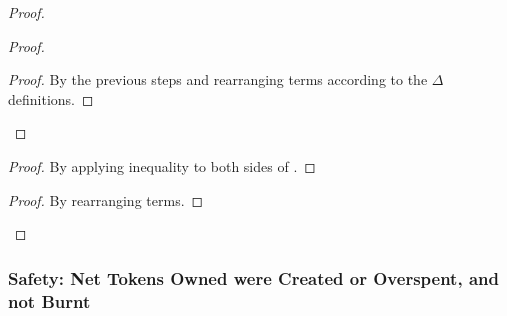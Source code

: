 \documentclass[9pt, oneside]{article}   	%
\begin{document}
\begin{proof}
\begin{proof}
		\qedstep
		\begin{proof}
			By the previous steps and rearranging terms according to the $\Delta$ definitions.
		\end{proof}                      
	\end{proof}

	\begin{proof}
		By applying inequality to both sides of .
	\end{proof}
	
	\qedstep
	\begin{proof}
		By rearranging terms.	
	\end{proof}
\end{proof}

\subsubsection{Safety: Net Tokens Owned were Created or Overspent, and not Burnt}
\label{sec:proof:balance-safety}
\end{document}
